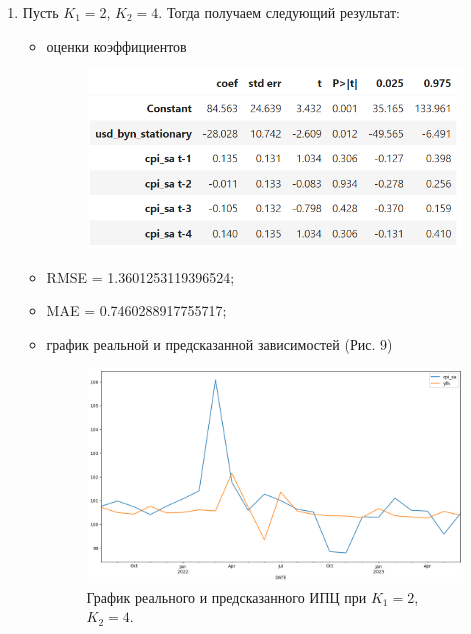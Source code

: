 \documentclass[a4paper, 14pt]{extarticle}
\begin{document}
\begin{enumerate}
\begin{itemize}
			\end{itemize}
			
			\item Пусть $K_1 = 2$, $K_2 = 4$. Тогда получаем следующий результат:
			\begin{itemize}
				\item оценки коэффициентов \begin{figure}[h!]
					\centering
					\includegraphics[scale=1.1]{images/tab_5}
					\label{fig:tab5}
				\end{figure}
				
				\item RMSE = 1.3601253119396524;
				\item MAE = 0.7460288917755717;
				\item график реальной и предсказанной зависимостей (Рис. 9)
				\begin{figure}[h!]
					\centering
					\includegraphics[scale=0.4]{images/pic_09}
					\caption[Рис. 9]{График реального и предсказанного ИПЦ при $K_1 = 2$, $K_2 =4$.}
					\label{fig:pic09}
				\end{figure}
				
			\end{itemize}
			

\end{enumerate}
\end{document}
